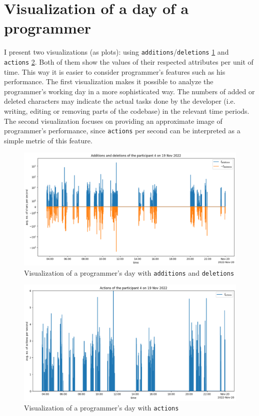 \section{Visualization of a day of a programmer}\label{sec:vis}

I present two visualizations (as plots): using \texttt{additions}/\texttt{deletions} \ref{fig:add_and_del_vis} and \texttt{actions} \ref{fig:actions_vis}. Both of them show the values of their respected attributes per unit of time. This way it is easier to consider programmer's features such as his performance. The first visualization makes it possible to analyze the programmer's working day in a more sophisticated way. The numbers of added or deleted characters may indicate the actual tasks done by the developer (i.e. writing, editing or removing parts of the codebase) in the relevant time periods. The second visualization focuses on providing an approximate image of programmer's performance, since \texttt{actions} per second can be interpreted as a simple metric of this feature.

\begin{figure}[htbp]
  \centering
  \includegraphics[scale=0.5]{chapters/results/graphics/add-and-del-vis.png}
  \caption{Visualization of a programmer's day with \texttt{additions} and \texttt{deletions}}
  \label{fig:add_and_del_vis}
\end{figure}

\begin{figure}[htbp]
  \centering
  \includegraphics[scale=0.5]{chapters/results/graphics/actions-vis.png}
  \caption{Visualization of a programmer's day with \texttt{actions}}
  \label{fig:actions_vis}
\end{figure}
